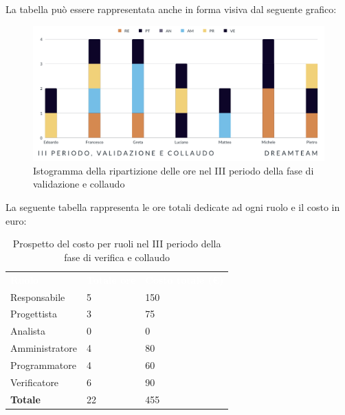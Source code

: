 La tabella può essere rappresentata anche in forma visiva dal seguente grafico:
\begin{figure}[H]
\centering
\includegraphics[scale=0.65]{Sezioni/SezioniPreventivo/grafici/Validazione_collaudo_III_periodo.png}
\caption{Istogramma della ripartizione delle ore nel III periodo della fase di validazione e collaudo}
\end{figure}

La seguente tabella rappresenta le ore totali dedicate ad ogni ruolo e il costo in euro:

\begin{table}[H]
\begin{center}
\renewcommand{\arraystretch}{1.5}
\begin{tabular}{ m{}<{\centering}  m{}<{\centering} m{}<{\centering}}
	\rowcolor{darkblue}
	\textcolor{white}{\textbf{Ruolo}}&\textcolor{white}{\textbf{Totale ore}}&\textcolor{white}{\textbf{Costo totale (\euro)}}\\ 

	Responsabile  & 5 & 150 \\	
	
	Progettista & 3 & 75 \\
	
	Analista & 0 & 0 \\

	Amministratore & 4 & 80 \\
	
	Programmatore & 4 & 60 \\
	
	Verificatore & 6 & 90 \\
	
	\textbf{Totale} & 22 & 455 \\
	
\end{tabular}
\caption{Prospetto del costo per ruoli nel III periodo della fase di verifica e collaudo}
\end{center}
\end{table}

